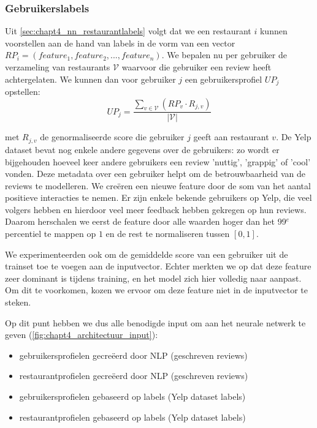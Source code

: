 \subsubsection{Gebruikerslabels}
Uit \autoref{sec:chapt4_nn_restaurantlabels} volgt dat we een restaurant $i$ kunnen voorstellen aan de hand van labels in de vorm van een vector $RP_i = (feature_1, feature_2, ..., feature_n)$. We bepalen nu per gebruiker de verzameling van restaurants $\mathcal{V}$ waarvoor die gebruiker een review heeft achtergelaten. We kunnen dan voor gebruiker $j$ een gebruikersprofiel $UP_j$ opstellen:
\begin{equation}
    UP_j = \frac{\sum_{v \in \mathcal{V}} (RP_v \cdot R_{j, v})}{\vert \mathcal{V} \vert}
\end{equation}

met $R_{j, v}$ de genormaliseerde score die gebruiker $j$ geeft aan restaurant $v$. De Yelp dataset bevat nog enkele andere gegevens over de gebruikers: zo wordt er bijgehouden hoeveel keer andere gebruikers een review 'nuttig', 'grappig' of 'cool' vonden. Deze metadata over een gebruiker helpt om de betrouwbaarheid van de reviews te modelleren. We creëren een nieuwe feature door de som van het aantal positieve interacties te nemen. Er zijn enkele bekende gebruikers op Yelp, die veel volgers hebben en hierdoor veel meer feedback hebben gekregen op hun reviews. Daarom herschalen we eerst de feature door alle waarden hoger dan het 99$^e$ percentiel te mappen op $1$ en de rest te normaliseren tussen $[0, 1]$.

We experimenteerden ook om de gemiddelde score van een gebruiker uit de trainset toe te voegen aan de inputvector. Echter merkten we op dat deze feature zeer dominant is tijdens training, en het model zich hier volledig naar aanpast. Om dit te voorkomen, kozen we ervoor om deze feature niet in de inputvector te steken.


Op dit punt hebben we dus alle benodigde input om aan het neurale netwerk te geven (\autoref{fig:chapt4_architectuur_input}):
\begin{itemize}
    \item gebruikersprofielen gecreëerd door NLP (geschreven reviews)
    \item restaurantprofielen gecreëerd door NLP (geschreven reviews)
    \item gebruikersprofielen gebaseerd op labels (Yelp dataset labels)
    \item restaurantprofielen gebaseerd op labels (Yelp dataset labels)
\end{itemize}

